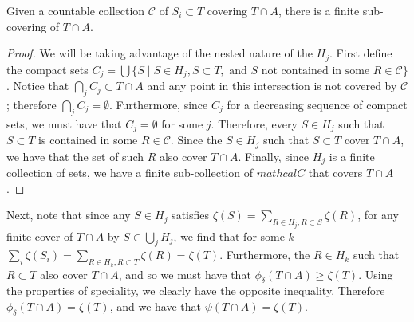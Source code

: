 \begin{lemma}
Given a countable collection \(\mathcal C\) of \(S_i \subset T\) covering \(T \cap A\), there is a
finite sub-covering of
\(T \cap A\).
\end{lemma}
\begin{proof}
We will be taking advantage of the nested nature of the \(H_j\). First define the compact sets
\(C_j = \bigcup \{S \mid S \in H_j, S \subset T, \text{ and } S \text{ not contained in some } R\in\mathcal C\}\).
Notice that 
\(\bigcap_j C_j \subset T \cap A\) and any point in this intersection is not covered by \(\mathcal C\);
therefore \(\bigcap_j C_j = \emptyset\). Furthermore, since \(C_j\) for a decreasing sequence of compact sets,
we must have that \(C_j = \emptyset\) for some \(j\). Therefore, every \(S\in H_j\) such that \(S\subset T\) is
contained in some \(R\in\mathcal C\). Since the \(S \in H_j\) such that \(S\subset T\) cover \(T\cap A\), we have
that the set of such \(R\) also cover \(T\cap A\). Finally, since \(H_j\) is a finite collection of sets, we have
a finite sub-collection of \(mathcal C\) that covers \(T \cap A\). 
\end{proof}

Next, note that since any \(S \in H_j\) satisfies \(\zeta(S) = \sum\limits_{R\in H_j, R \subset S} \zeta(R)\), for
any finite cover of \(T\cap A\) by \(S \in \bigcup_j H_j\), we find that for some \(k\)
\(\sum_i\zeta(S_i) = \sum\limits_{R \in H_k, R\subset T} \zeta(R) = \zeta(T)\). Furthermore, the \(R\in H_k\)
such that \(R \subset T\) also cover \(T \cap A\), and so we must have that \(\phi_\delta(T\cap A) \geq \zeta(T)\). 
Using the properties of speciality, we clearly have the opposite 
inequality. Therefore \(\phi_\delta(T\cap A) = \zeta(T)\), and we have that \(\psi(T\cap A) = \zeta(T)\).
